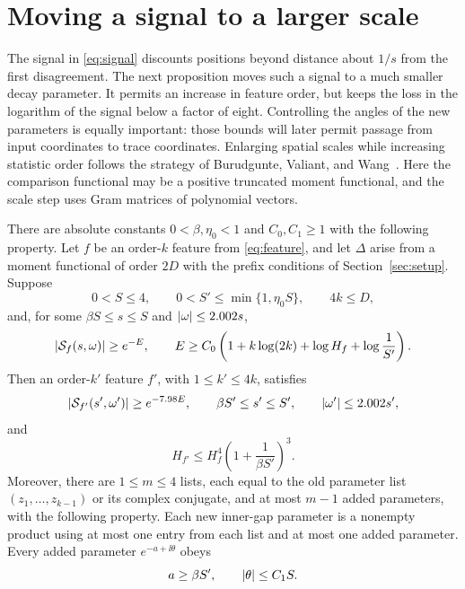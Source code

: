 \section{Moving a signal to a larger scale}\label{sec:multiscale}

The signal in \eqref{eq:signal} discounts positions beyond distance about
$1/s$ from the first disagreement.  The next proposition moves such a signal
to a much smaller decay parameter.  It permits an increase in feature order,
but keeps the loss in the logarithm of the signal below a factor of eight.
Controlling the angles of the new parameters is equally important: those
bounds will later permit passage from input coordinates to trace coordinates.
Enlarging spatial scales while increasing statistic order follows the
strategy of Burudgunte, Valiant, and Wang~\cite{BVW2026}.  Here the comparison
functional may be a positive truncated moment functional, and the scale step
uses Gram matrices of polynomial vectors.

\begin{proposition}\label{prop:multiscale}
There are absolute constants $0<\beta,\eta_0<1$ and $C_0,C_1\ge1$ with the
following property.  Let $f$ be an order-$k$ feature from
\eqref{eq:feature}, and let $\Delta$ arise from a moment functional of order
$2D$ with the prefix conditions of Section~\ref{sec:setup}.  Suppose
\[
 0<S\le4,\qquad 0<S'\le\min\{1,\eta_0S\},\qquad 4k\le D,
\]
and, for some $\beta S\le s\le S$ and $\lvert \omega\rvert\le2.002s$,
\begin{equation}\label{eq:multiscale-cost}
 \lvert \mathcal S_f(s,\omega)\rvert\ge e^{-E},\qquad
 E\ge C_0\left(1+k\log(2k)+\log H_f+\log\frac1{S'}\right).
\end{equation}
Then an order-$k'$ feature $f'$, with $1\le k'\le4k$, satisfies
\begin{equation}\label{eq:multiscale-output}
 \lvert \mathcal S_{f'}(s',\omega')\rvert\ge e^{-7.98E},\qquad
 \beta S'\le s'\le S',\qquad \lvert \omega'\rvert\le2.002s',
\end{equation}
and
\begin{equation}\label{eq:multiscale-height}
 H_{f'}\le H_f^4\left(1+\frac1{\beta S'}\right)^3.
\end{equation}
Moreover, there are $1\le m\le4$ lists, each equal to the old parameter list
$(z_1,\ldots,z_{k-1})$ or its complex conjugate, and at most $m-1$ added
parameters, with the following property.  Each new inner-gap parameter is a
nonempty product using at most one entry from each list and at most one added
parameter.  Every added parameter $e^{-a+\ii\theta}$ obeys
\begin{equation}\label{eq:added-parameters}
 a\ge\beta S',\qquad \lvert \theta\rvert\le C_1S.
\end{equation}
\end{proposition}

